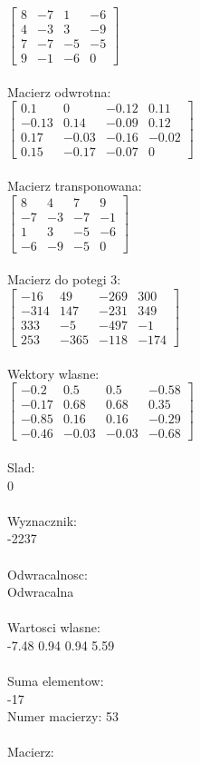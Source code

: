 \documentclass[a4paper,12pt]{article}
\begin{document}
$\begin{bmatrix} 8&-7&1&-6\\4&-3&3&-9\\7&-7&-5&-5\\9&-1&-6&0 \end{bmatrix}$
\\
\\
Macierz odwrotna:\\

$\begin{bmatrix} 0.1&0&-0.12&0.11\\-0.13&0.14&-0.09&0.12\\0.17&-0.03&-0.16&-0.02\\0.15&-0.17&-0.07&0 \end{bmatrix}$
\\
\\
Macierz transponowana:\\

$\begin{bmatrix} 8&4&7&9\\-7&-3&-7&-1\\1&3&-5&-6\\-6&-9&-5&0 \end{bmatrix}$
\\
\\
Macierz do potegi 3:\\

$\begin{bmatrix} -16&49&-269&300\\-314&147&-231&349\\333&-5&-497&-1\\253&-365&-118&-174 \end{bmatrix}$
\\
\\
Wektory wlasne:\\

$\begin{bmatrix} -0.2&0.5&0.5&-0.58\\-0.17&0.68&0.68&0.35\\-0.85&0.16&0.16&-0.29\\-0.46&-0.03&-0.03&-0.68 \end{bmatrix}$
\\
\\
Slad:\\
0
\\
\\
Wyznacznik:\\
-2237
\\
\\
Odwracalnosc:\\
Odwracalna
\\
\\
Wartosci wlasne:\\
-7.48 0.94 0.94 5.59
\\
\\
Suma elementow:\\
-17
\\
\newpage
Numer macierzy:
53
\\
\\
Macierz:\\
\end{document}
